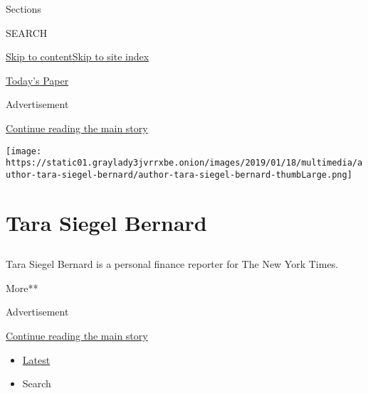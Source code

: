Sections

SEARCH

\protect\hyperlink{site-content}{Skip to
content}\protect\hyperlink{site-index}{Skip to site index}

\href{https://myaccount.nytimes3xbfgragh.onion/auth/login?response_type=cookie\&client_id=vi}{}

\href{https://www.nytimes3xbfgragh.onion/section/todayspaper}{Today's
Paper}

Advertisement

\protect\hyperlink{after-top}{Continue reading the main story}

\texttt{[image: https://static01.graylady3jvrrxbe.onion/images/2019/01/18/multimedia/author-tara-siegel-bernard/author-tara-siegel-bernard-thumbLarge.png]}

\hypertarget{tara-siegel-bernard}{%
\section{Tara Siegel Bernard}\label{tara-siegel-bernard}}

\subsection{}

Tara Siegel Bernard is a personal finance reporter for The New York
Times.

More**

Advertisement

\protect\hyperlink{after-mid1}{Continue reading the main story}

\begin{itemize}
\tightlist
\item
  \protect\hyperlink{stream-panel}{Latest}
\item
  Search
\end{itemize}

